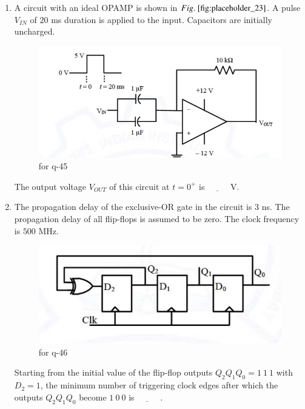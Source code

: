 \documentclass[journal,12pt,onecolumn]{IEEEtran}
\theoremstyle{remark}
\begin{document}
\begin{enumerate}
\hfill {}

\item A circuit with an ideal OPAMP is shown in $\figref{fig:placeholder_23}$. A pulse $V_{IN}$ of $20$ ms duration is applied to the input. Capacitors are initially uncharged. 
\begin{figure}[H]
    \centering
    \includegraphics[width=0.4\columnwidth]{figs/23.png}
    \caption{\centering for q-45}
    \label{fig:placeholder_23}
\end{figure}
The output voltage $V_{OUT}$ of this circuit at $t = 0^+$  is $\underline{\hspace{1cm}}$ V.  

\hfill {}

\item The propagation delay of the exclusive-OR  gate in the circuit is $3$ ns. The propagation delay of all flip-flops is assumed to be zero. The clock  frequency is $500$ MHz.  
\begin{figure}[H]
    \centering
    \includegraphics[width=0.4\columnwidth]{figs/24.png}
    \caption{\centering for q-46}
    \label{fig:placeholder_24}
\end{figure}
Starting from the initial value of the flip-flop outputs $Q_2 Q_1 Q_0 = 1 \ 1\ 1$ with $D_2 = 1$, the minimum number of triggering clock edges after which the outputs $Q_2 Q_1 Q_0$ become $1\ 0\ 0$  is $\underline{\hspace{1cm}}$ .

\hfill {}


\end{enumerate}
\end{document}
